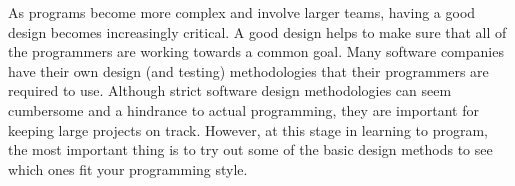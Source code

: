 As programs become more complex and involve larger teams, having a good design becomes increasingly critical.  A good design helps to make sure that all of the programmers are working towards a common goal.  Many software companies have their own design (and testing) methodologies that their programmers are required to use.  Although strict software design methodologies can seem cumbersome and a hindrance to actual programming, they are important for keeping large projects on track.  However, at this stage in learning to program, the most important thing is to try out some of the basic design methods to see which ones fit your programming style.



